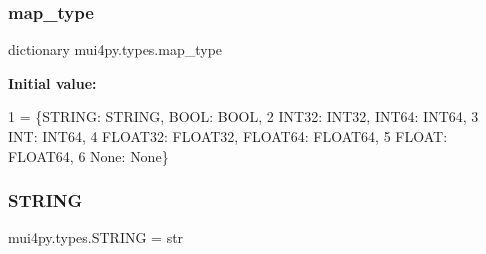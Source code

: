 \mbox{\label{namespacemui4py_1_1types_ab8ef776fe36ad2e5d79102804c2b21d8}} 
\subsubsection{\texorpdfstring{map\+\_\+type}{map\_type}}
{\footnotesize\ttfamily dictionary mui4py.\+types.\+map\+\_\+type}

{\bfseries Initial value\+:}
\begin{DoxyCode}
1 =  \{STRING: STRING, BOOL: BOOL,
2             INT32: INT32, INT64: INT64,
3             INT: INT64,
4             FLOAT32: FLOAT32, FLOAT64: FLOAT64,
5             FLOAT: FLOAT64,
6             \textcolor{keywordtype}{None}: \textcolor{keywordtype}{None}\}
\end{DoxyCode}
\mbox{\label{namespacemui4py_1_1types_a2cf5b7a10d04fc1c64862a3a98d6a5ab}} 
\subsubsection{\texorpdfstring{S\+T\+R\+I\+NG}{STRING}}
{\footnotesize\ttfamily mui4py.\+types.\+S\+T\+R\+I\+NG = str}

